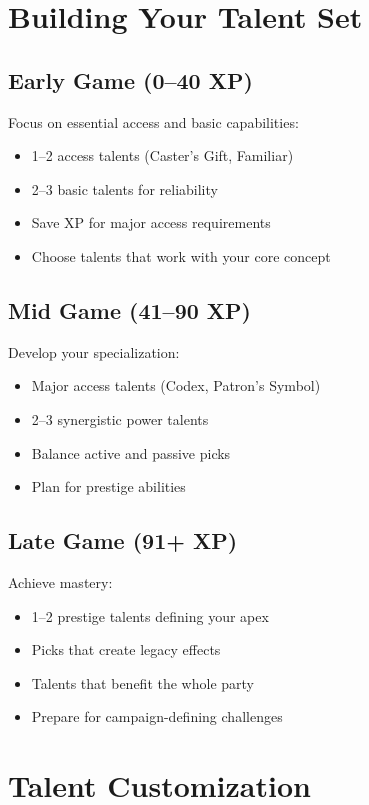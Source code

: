 \section{Building Your Talent Set}

\subsection*{Early Game (0--40 XP)}
Focus on essential access and basic capabilities:
\begin{itemize}
\item 1--2 access talents (Caster's Gift, Familiar)
\item 2--3 basic talents for reliability
\item Save XP for major access requirements
\item Choose talents that work with your core concept
\end{itemize}

\subsection*{Mid Game (41--90 XP)}
Develop your specialization:
\begin{itemize}
\item Major access talents (Codex, Patron's Symbol)
\item 2--3 synergistic power talents
\item Balance active and passive picks
\item Plan for prestige abilities
\end{itemize}

\subsection*{Late Game (91+ XP)}
Achieve mastery:
\begin{itemize}
\item 1--2 prestige talents defining your apex
\item Picks that create legacy effects
\item Talents that benefit the whole party
\item Prepare for campaign-defining challenges
\end{itemize}

\section{Talent Customization}

